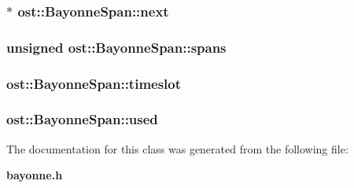 \subsubsection[{next}]{$\ast$ {\bf ost::BayonneSpan::next}\hspace{0.3cm}{\ttfamily  [protected]}}\label{classost_1_1_bayonne_span_a562c195db74ae1b94ab00546b31549f1}
\subsubsection[{spans}]{\setlength{\rightskip}{0pt plus 5cm}unsigned {\bf ost::BayonneSpan::spans}\hspace{0.3cm}{\ttfamily  [static, protected]}}\label{classost_1_1_bayonne_span_a79ad97ae1214b5bc7d7c6e45fdb523c6}
\subsubsection[{timeslot}]{ {\bf ost::BayonneSpan::timeslot}\hspace{0.3cm}{\ttfamily  [protected]}}\label{classost_1_1_bayonne_span_a9dc4dba2dac5a79c78ea8b6947b3748d}
\subsubsection[{used}]{ {\bf ost::BayonneSpan::used}\hspace{0.3cm}{\ttfamily  [protected]}}\label{classost_1_1_bayonne_span_ad88bb76025e95b600abdb2a2135d2a80}


The documentation for this class was generated from the following file:\begin{DoxyCompactItemize}
\item 
{\bf bayonne.h}\end{DoxyCompactItemize}
